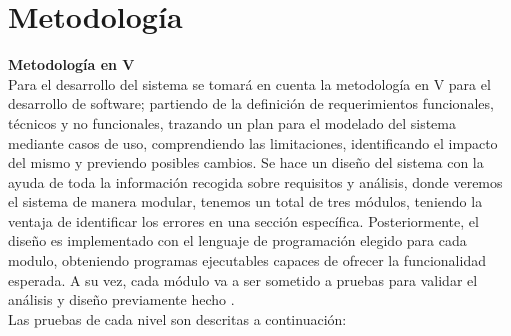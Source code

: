 \section{Metodología}

\textbf{Metodología en V}\\
Para el desarrollo del sistema se tomará en cuenta la metodología en V para el desarrollo de software; partiendo de la definición de requerimientos funcionales, técnicos y no funcionales, trazando un plan para el modelado del sistema mediante casos de uso, comprendiendo las limitaciones, identificando el impacto del mismo y previendo posibles cambios. Se hace un diseño del sistema con la ayuda de toda la información recogida sobre requisitos y análisis, donde veremos el sistema de manera modular, tenemos un total de tres módulos, teniendo la ventaja de identificar los errores en una sección específica. Posteriormente, el diseño es implementado con el lenguaje de programación elegido para cada modulo, obteniendo programas ejecutables capaces de ofrecer la funcionalidad esperada. A su vez, cada módulo va a ser sometido a pruebas para validar el análisis y diseño previamente hecho \citep{Metodologia1}.
\\
Las pruebas de cada nivel son descritas a continuación:

